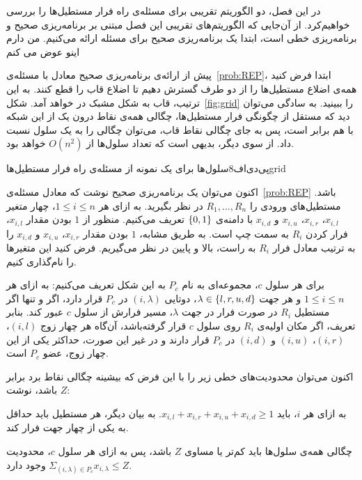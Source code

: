 

در این فصل، دو الگوریتم تقریبی برای مسئله‌ی راه فرار مستطیل‌ها را بررسی خواهیم‌کرد. از آن‌جایی که الگوریتم‌های تقریبی این فصل مبتنی بر برنامه‌ریزی صحیح و برنامه‌ریزی خطی است، ابتدا یک برنامه‌ریزی صحیح برای مسئله ارائه می‌کنیم.
من دارم اینو عوض می کنم

پیش از ارائه‌ی برنامه‌ریزی صحیح معادل با مسئله‌ی~\ref{prob:REP}، ابتدا فرض کنید همه‌ی اضلاع مستطیل‌ها را از دو طرف گسترش دهیم تا اضلاع قاب را قطع کنند. به این ترتیب، قاب به شکل مشبک در خواهد آمد. شکل~\ref{fig:grid} را ببینید. به سادگی می‌توان دید که مستقل از چگونگی فرار مستطیل‌ها، چگالی همه‌ی نقاط درون یک  از این شبکه با هم برابر است، پس به جای چگالی نقاط قاب، می‌توان چگالی را به یک سلول نسبت داد. از سوی دیگر، بدیهی است که تعداد سلول‌ها از $O(n ^ 2)$ خواهد بود. 

‌پی‌دی‌اف{8}{سلول‌ها برای یک نمونه از مسئله‌ی راه فرار مستطیل‌ها}{grid}


اکنون می‌توان یک برنامه‌ریزی صحیح نوشت که معادل مسئله‌ی~\ref{prob:REP}  باشد. مستطیل‌های ورودی را $R_{1}, \ldots, R_{n}$ در نظر بگیرید. به ازای هر $1 \leq i \leq n$، چهار متغیر $x_{i, l}$، $x_{i, r}$، $x_{i, u}$ و $x_{i, d}$ با دامنه‌ی ${\{ 0, 1 \}}$ تعریف می‌کنیم. منظور از $1$ بودن مقدار $x_{i, l}$، فرار کردن $R_{i}$ به سمت چپ است. به طریق مشابه، $1$ بودن مقدار $x_{i, r}$، $x_{i, u}$ و $x_{i, d}$ را به ترتیب معادل فرار $R_{i}$ به راست، بالا و پایین در نظر می‌گیریم. فرض کنید این متغیر‌ها را  نام‌گذاری کنیم.

برای هر سلول $c$، مجموعه‌ای به نام $P_{c}$ به این شکل تعریف می‌کنیم: به ازای هر $1 \leq i \leq n$ و هر جهت $\lambda \in {\{ l, r, u, d \}}$، دوتایی $(i, \lambda)$ در $P_{c}$ قرار دارد، اگر و تنها اگر مستطیل $R_{i}$ در صورت فرار در جهت $\lambda$، مسیر فرارش از سلول $c$ عبور کند. بنابر تعریف، اگر مکان اولیه‌ی $R_{i}$ روی سلول $c$ قرار گرفته‌باشد، آن‌گاه هر چهار زوج $(i, l)$، $(i, r)$، $(i, u)$ و $(i, d)$ در $P_{c}$ قرار دارند و در غیر این صورت، حد‌اکثر یکی از این چهار زوج، عضو $P_{c}$ است.

اکنون می‌توان محدودیت‌های خطی زیر را با این فرض که بیشینه چگالی نقاط برد برابر $Z$ باشد، نوشت:


 به ازای هر $i$، باید $x_{i, l} + x_{i, r} + x_{i, u} + x_{i, d} \geq 1$. به بیان دیگر، هر مستطیل باید حد‌اقل به یکی از چهار جهت فرار کند.

 چگالی همه‌ی سلول‌ها باید کم‌تر یا مساوی $Z$ باشد، پس به ازای هر سلول $c$، محدودیت $\Sigma_{(i, \lambda) \in P_{c}} x_{i, \lambda} \leq Z$ وجود دارد.


